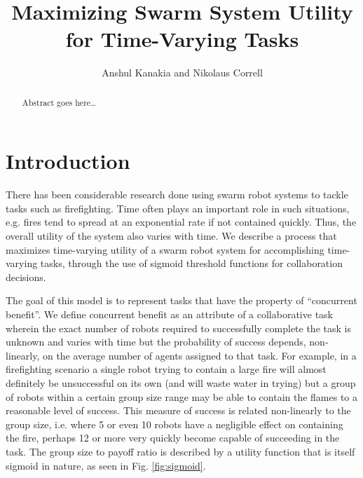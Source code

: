 \documentclass{sage}
\begin{document}
\title{Maximizing Swarm System Utility for Time-Varying Tasks}
\author{Anshul Kanakia and Nikolaus Correll}
\address{Department of Computer Science,
	University of Colorado, Boulder, USA}

\maketitle

\begin{abstract}
Abstract goes here\ldots
\end{abstract}

\section{Introduction}
There has been considerable research done using swarm robot systems to tackle tasks  such as firefighting. Time often plays an important role in such situations, e.g. fires tend to spread at an exponential rate if not contained quickly. Thus, the overall utility of the system also varies with time. We describe a process that maximizes time-varying utility of a swarm robot system for accomplishing time-varying tasks, through the use of sigmoid threshold functions for collaboration decisions.

The goal of this model is to represent tasks that have the property of ``concurrent benefit''. We define concurrent benefit as an attribute of a collaborative task wherein the exact number of robots required to successfully complete the task is unknown and varies with time but the probability of success depends, non-linearly, on the average number of agents assigned to that task. For example, in a firefighting scenario a single robot trying to contain a large fire will almost definitely be unsuccessful on its own (and will waste water in trying) but a group of robots within a certain group size range may be able to contain the flames to a reasonable level of success. This measure of success is related non-linearly to the group size, i.e. where 5 or even 10 robots have a negligible effect on containing the fire, perhaps 12 or more very quickly become capable of succeeding in the task. The group size to payoff ratio is described by a utility function that is itself sigmoid in nature, as seen in Fig. \ref{fig:sigmoid}.
\end{document}
